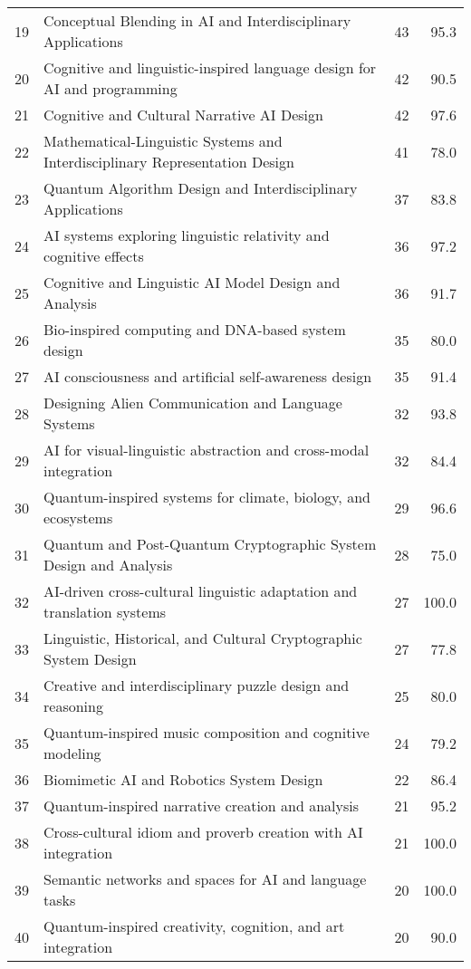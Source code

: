\begin{table}[h!]
{\begin{tabular}{r l r r}
19 & Conceptual Blending in AI and Interdisciplinary Applications & 43 & 95.3 \\
20 & Cognitive and linguistic-inspired language design for AI and programming & 42 & 90.5 \\
21 & Cognitive and Cultural Narrative AI Design & 42 & 97.6 \\
22 & Mathematical-Linguistic Systems and Interdisciplinary Representation Design & 41 & 78.0 \\
23 & Quantum Algorithm Design and Interdisciplinary Applications & 37 & 83.8 \\
24 & AI systems exploring linguistic relativity and cognitive effects & 36 & 97.2 \\
25 & Cognitive and Linguistic AI Model Design and Analysis & 36 & 91.7 \\
26 & Bio-inspired computing and DNA-based system design & 35 & 80.0 \\
27 & AI consciousness and artificial self-awareness design & 35 & 91.4 \\
28 & Designing Alien Communication and Language Systems & 32 & 93.8 \\
29 & AI for visual-linguistic abstraction and cross-modal integration & 32 & 84.4 \\
30 & Quantum-inspired systems for climate, biology, and ecosystems & 29 & 96.6 \\
31 & Quantum and Post-Quantum Cryptographic System Design and Analysis & 28 & 75.0 \\
32 & AI-driven cross-cultural linguistic adaptation and translation systems & 27 & 100.0 \\
33 & Linguistic, Historical, and Cultural Cryptographic System Design & 27 & 77.8 \\
34 & Creative and interdisciplinary puzzle design and reasoning & 25 & 80.0 \\
35 & Quantum-inspired music composition and cognitive modeling & 24 & 79.2 \\
36 & Biomimetic AI and Robotics System Design & 22 & 86.4 \\
37 & Quantum-inspired narrative creation and analysis & 21 & 95.2 \\
38 & Cross-cultural idiom and proverb creation with AI integration & 21 & 100.0 \\
39 & Semantic networks and spaces for AI and language tasks & 20 & 100.0 \\
40 & Quantum-inspired creativity, cognition, and art integration & 20 & 90.0 \\

\end{tabular}}
\end{table}
